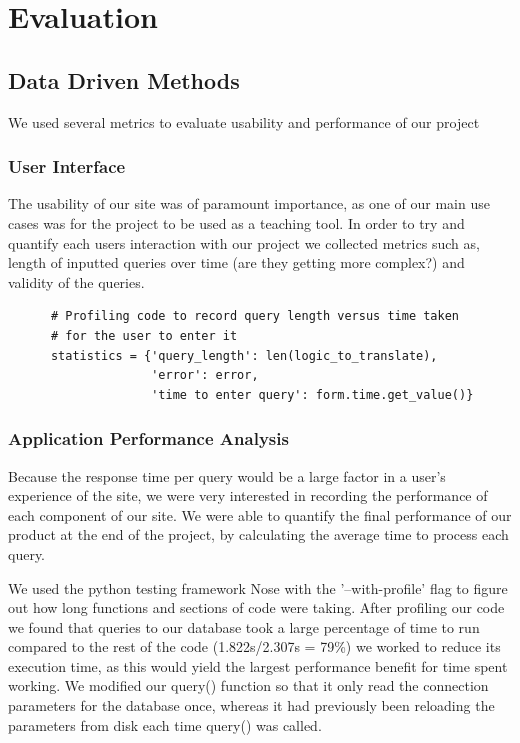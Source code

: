 \documentclass[a4paper, 11pt]{article}
\begin{document}
\section{Evaluation}

  \subsection{Data Driven Methods}
    We used several metrics to evaluate usability and performance of our project
    \subsubsection{User Interface}
    The usability of our site was of paramount importance, as one of our main
    use cases was for the project to be used as a teaching tool. In order to try
    and quantify each users interaction with our project we collected metrics
    such as, length of inputted queries over time (are they getting more
    complex?) and validity of the queries.

    \begin{verbatim}
      # Profiling code to record query length versus time taken
      # for the user to enter it
      statistics = {'query_length': len(logic_to_translate),
                    'error': error,
                    'time to enter query': form.time.get_value()}

    \end{verbatim}
    
    \subsubsection{Application Performance Analysis}

    Because the response time per query would be a large factor in a user's
    experience of the site, we were very interested in recording the performance
    of each component of our site. We were able to quantify the final
    performance of our product at the end of the project, by calculating the
    average time to process each query.

    We used the python testing framework Nose with the '--with-profile' flag to
    figure out how long functions and sections of code were taking. 
    After profiling our code we found that queries to our database took a large
    percentage of time to run compared to the rest of the code (1.822s/2.307s =
    79\%) we worked to reduce its execution time, as this would yield the largest
    performance benefit for time spent working. 
    We modified our query() function so that it only read the connection 
    parameters for the database once, whereas it had previously been reloading 
    the  parameters from disk each time query() was called.  
\end{document}
